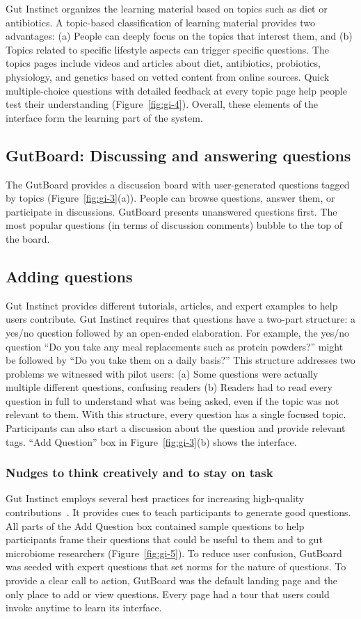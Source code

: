 Gut Instinct organizes the learning material based on topics such as diet or antibiotics. A topic-based classification of learning material provides two advantages: (a) People can deeply focus on the topics that interest them, and (b) Topics related to specific lifestyle aspects can trigger specific questions. The topics pages include videos and articles about diet, antibiotics, probiotics, physiology, and genetics based on vetted content from online sources. Quick multiple-choice questions with detailed feedback at every topic page help people test their understanding (Figure~\ref{fig:gi-4}). Overall, these elements of the interface form the learning part of the system. 

\subsection{GutBoard: Discussing and answering questions}
The GutBoard provides a discussion board with user-generated questions tagged by topics (Figure~\ref{fig:gi-3}(a)). People can browse questions, answer them, or participate in discussions. GutBoard presents unanswered questions first. The most popular questions (in terms of discussion comments) bubble to the top of the board.
 
\subsection{Adding questions}
Gut Instinct provides different tutorials, articles, and expert examples to help users contribute. Gut Instinct requires that questions have a two-part structure: a yes/no question followed by an open-ended elaboration. For example, the yes/no question “Do you take any meal replacements such as protein powders?” might be followed by “Do you take them on a daily basis?” This structure addresses two problems we witnessed with pilot users: (a) Some questions were actually multiple different questions, confusing readers (b) Readers had to read every question in full to understand what was being asked, even if the topic was not relevant to them. With this structure, every question has a single focused topic. Participants can also start a discussion about the question and provide relevant tags. “Add Question” box in Figure~\ref{fig:gi-3}(b) shows the interface.

\subsubsection{Nudges to think creatively and to stay on task}
Gut Instinct employs several best practices for increasing high-quality contributions~\cite{Jennett2014, Resnick2011}. It provides cues to teach participants to generate good questions. All parts of the Add Question box contained sample questions to help participants frame their questions that could be useful to them and to gut microbiome researchers (Figure~\ref{fig:gi-5}). To reduce user confusion, GutBoard was seeded with expert questions that set norms for the nature of questions. To provide a clear call to action, GutBoard was the default landing page and the only place to add or view questions. Every page had a tour that users could invoke anytime to learn its interface.

